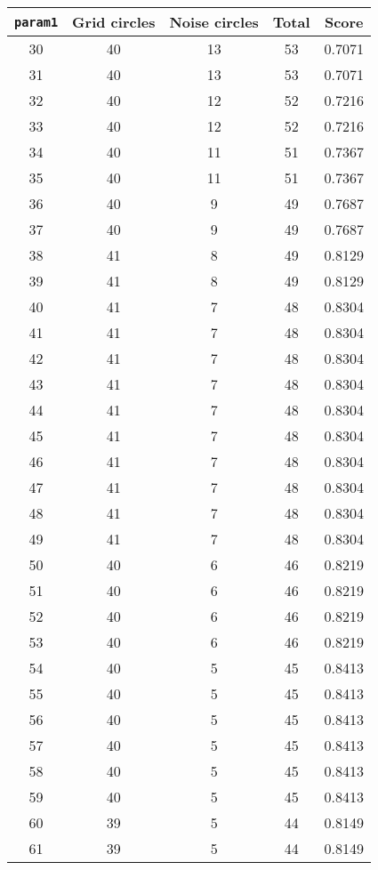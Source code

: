 \documentclass[letterpaper, 12pt]{article}
\begin{document}
\begin{longtable}{|c|c|c|c|c|}
\hline
\textbf{\texttt{param1}} & \textbf{Grid circles} & \textbf{Noise circles} & \textbf{Total} & \textbf{Score} \\
\hline
30 & 40 & 13 & 53 & 0.7071 \\
\hline
31 & 40 & 13 & 53 & 0.7071 \\
\hline
32 & 40 & 12 & 52 & 0.7216 \\
\hline
33 & 40 & 12 & 52 & 0.7216 \\
\hline
34 & 40 & 11 & 51 & 0.7367 \\
\hline
35 & 40 & 11 & 51 & 0.7367 \\
\hline
36 & 40 & 9 & 49 & 0.7687 \\
\hline
37 & 40 & 9 & 49 & 0.7687 \\
\hline
38 & 41 & 8 & 49 & 0.8129 \\
\hline
39 & 41 & 8 & 49 & 0.8129 \\
\hline
40 & 41 & 7 & 48 & 0.8304 \\
\hline
41 & 41 & 7 & 48 & 0.8304 \\
\hline
42 & 41 & 7 & 48 & 0.8304 \\
\hline
43 & 41 & 7 & 48 & 0.8304 \\
\hline
44 & 41 & 7 & 48 & 0.8304 \\
\hline
45 & 41 & 7 & 48 & 0.8304 \\
\hline
46 & 41 & 7 & 48 & 0.8304 \\
\hline
47 & 41 & 7 & 48 & 0.8304 \\
\hline
48 & 41 & 7 & 48 & 0.8304 \\
\hline
49 & 41 & 7 & 48 & 0.8304 \\
\hline
50 & 40 & 6 & 46 & 0.8219 \\
\hline
51 & 40 & 6 & 46 & 0.8219 \\
\hline
52 & 40 & 6 & 46 & 0.8219 \\
\hline
53 & 40 & 6 & 46 & 0.8219 \\
\hline
54 & 40 & 5 & 45 & 0.8413 \\
\hline
55 & 40 & 5 & 45 & 0.8413 \\
\hline
56 & 40 & 5 & 45 & 0.8413 \\
\hline
57 & 40 & 5 & 45 & 0.8413 \\
\hline
58 & 40 & 5 & 45 & 0.8413 \\
\hline
59 & 40 & 5 & 45 & 0.8413 \\
\hline
60 & 39 & 5 & 44 & 0.8149 \\
\hline
61 & 39 & 5 & 44 & 0.8149 \\

\end{longtable}
\end{document}
